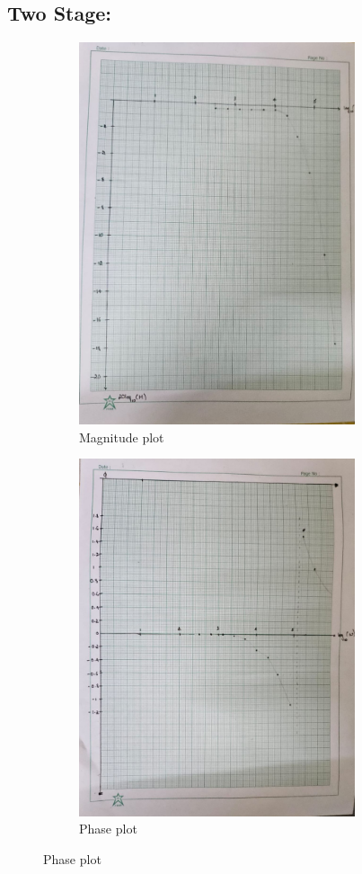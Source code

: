 \documentclass[a4paper,12pt]{article}
\begin{document}
\subsection{Two Stage:}
\pagebreak
\begin{figure}[h!]
	\begin{subfigure}[b]{100pt}
		\caption{Magnitude plot}
		\includegraphics[width = 230pt]{figs/fig3.png}
	\end{subfigure}
	\hspace{110pt}
	\begin{subfigure}[b]{100pt}
		\caption{Phase plot}
		\includegraphics[width = 230pt]{figs/fig4.png}
	\end{subfigure}
\end{figure}
\end{document}
